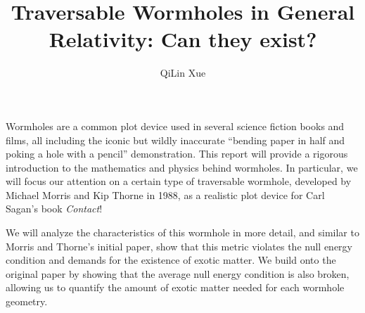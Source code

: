 \documentclass[%
 reprint,
 amsmath,amssymb
 aps,
]{revtex4}
\theoremstyle{remark}
\begin{document}
\title{Traversable Wormholes in General Relativity: Can they exist?}
\author{QiLin Xue}
\maketitle
\tableofcontents
\vspace{4mm}

Wormholes are a common plot device used in several science fiction books and films, all including the iconic but wildly inaccurate ``bending paper in half and poking a hole with a pencil'' demonstration. This report will provide a rigorous introduction to the mathematics and physics behind wormholes. In particular, we will focus our attention on a certain type of traversable wormhole, developed by Michael Morris and Kip Thorne in 1988, as a realistic plot device for Carl Sagan's book \textit{Contact}\cite{Thorne}!
\vspace{2mm}

We will analyze the characteristics of this wormhole in more detail, and similar to Morris and Thorne's initial paper, show that this metric violates the null energy condition and demands for the existence of exotic matter. We build onto the original paper by showing that the average null energy condition is also broken, allowing us to quantify the amount of exotic matter needed for each wormhole geometry.
\end{document}
